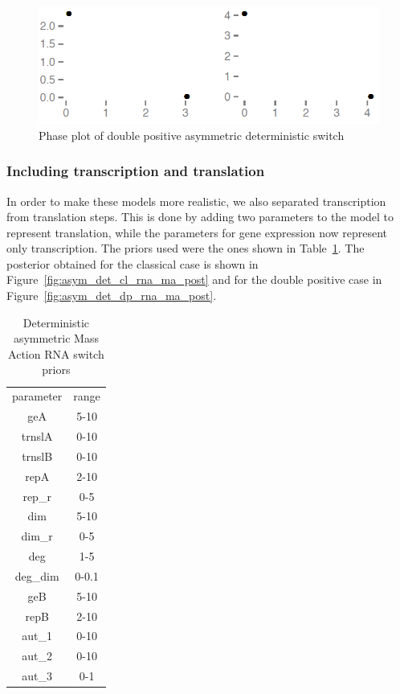 \begin{figure}[htbp]
\begin{center}
\includegraphics[scale=0.2]{chapterStabilityFinder/mass_action_switches/deterministic/asym/dp_det_phase.png}
\caption{Phase plot of double positive asymmetric deterministic switch}\label{fig:asym_det_dp_ma_phase}
\end{center}
\end{figure}

\clearpage
\subsubsection{Including transcription and translation}
In order to make these models more realistic, we also separated transcription from translation steps. This is done by adding two parameters to the model to represent translation, while the parameters for gene expression now represent only transcription. The priors used were the ones shown in Table~\ref{tab:asym_cl_rna_det_ma}. The posterior obtained for the classical case is shown in Figure~\ref{fig:asym_det_cl_rna_ma_post} and for the double positive case in Figure~\ref{fig:asym_det_dp_rna_ma_post}.

\begin{table}[htbp]
\centering
\caption{Deterministic asymmetric Mass Action RNA switch priors}
\label{tab:asym_cl_rna_det_ma}
\begin{tabular}{cc}
parameter & range \\
geA & 5-10 \\
trnslA & 0-10 \\
trnslB & 0-10 \\
repA & 2-10 \\
rep\_r & 0-5 \\
dim & 5-10 \\
dim\_r & 0-5 \\
deg & 1-5 \\
deg\_dim & 0-0.1 \\
geB & 5-10 \\
repB & 2-10 \\
aut\_1 & 0-10\\
aut\_2 & 0-10\\
aut\_3 & 0-1\\
\end{tabular}
\end{table}

